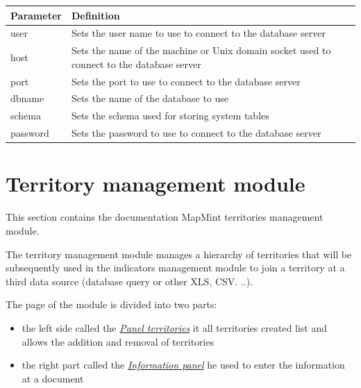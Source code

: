 \documentclass[letterpaper,10pt,english]{sphinxmanual}
\begin{document}
\begin{tabulary}{\linewidth}{|L|L|}
\hline

\textbf{Parameter}
 & 
\textbf{Definition}
\\
\hline
user
 & 
Sets the user name to use to connect to the database server
\\
\hline
host
 & 
Sets the name of the machine or Unix domain socket used to connect to the database server
\\
\hline
port
 & 
Sets the port to use to connect to the database server
\\
\hline
dbname
 & 
Sets the name of the database to use
\\
\hline
schema
 & 
Sets the schema used for storing system tables
\\
\hline
password
 & 
Sets the password to use to connect to the database server
\\
\hline\end{tabulary}



\chapter{Territory management module}
\label{territories/index:territories}\label{territories/index::doc}\label{territories/index:module-de-gestion-des-territoires}
This section contains the documentation MapMint territories management module.

The territory management module manages a hierarchy of territories that will be subsequently used in the indicators management module to join a territory at a third data source (database query or other XLS, CSV. ..).

The page of the module is divided into two parts:
\begin{itemize}
\item {} 
the left side called the {\hyperref[territories/territorieslist::doc]{\emph{\emph{Panel territories}}}} it all territories created list and allows the addition and removal of territories

\item {} 
the right part called the {\hyperref[territories/infopanel::doc]{\emph{\emph{Information panel}}}} he used to enter the information at a document

\end{itemize}
\end{document}
